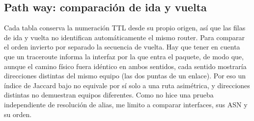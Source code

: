 \subsection{Path way: comparación de ida y vuelta}\label{sec:vuelta}


Cada tabla conserva la numeración TTL desde su propio origen, así que las filas de ida y vuelta no identifican automáticamente el mismo router. Para comparar el orden invierto por separado la secuencia de vuelta. Hay que tener en cuenta que un traceroute informa la interfaz por la que entra el paquete, de modo que, aunque el camino físico fuera idéntico en ambos sentidos, cada sentido mostraría direcciones distintas del mismo equipo (las dos puntas de un enlace). Por eso un índice de Jaccard bajo no equivale por sí solo a una ruta asimétrica, y direcciones distintas no demuestran equipos diferentes. Como no hice una prueba independiente de resolución de alias, me limito a comparar interfaces, sus ASN y su orden.



